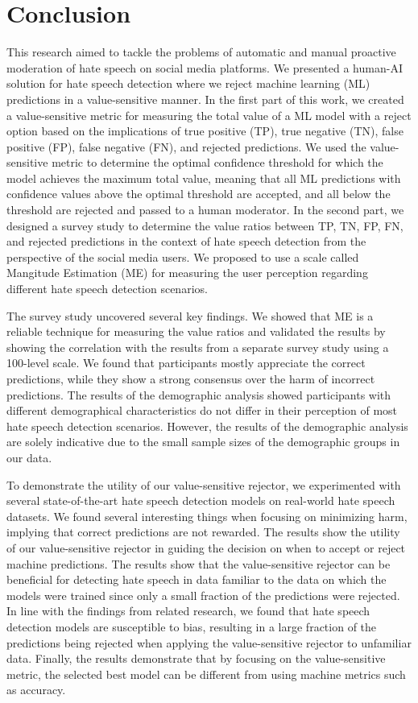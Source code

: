 \chapter{Conclusion}
This research aimed to tackle the problems of automatic and manual proactive moderation of hate speech on social media platforms.
%
We presented a human-AI solution for hate speech detection where we reject machine learning (ML) predictions in a value-sensitive manner.
%
In the first part of this work, we created a value-sensitive metric for measuring the total value of a ML model with a reject option based on the implications of true positive (TP), true negative (TN), false positive (FP), false negative (FN), and rejected predictions.
%
We used the value-sensitive metric to determine the optimal confidence threshold for which the model achieves the maximum total value, meaning that all ML predictions with confidence values above the optimal threshold are accepted, and all below the threshold are rejected and passed to a human moderator.
%
In the second part, we designed a survey study to determine the value ratios between TP, TN, FP, FN, and rejected predictions in the context of hate speech detection from the perspective of the social media users.
%
We proposed to use a scale called Mangitude Estimation (ME) for measuring the user perception regarding different hate speech detection scenarios.
%

%
The survey study uncovered several key findings.
%
We showed that ME is a reliable technique for measuring the value ratios and validated the results by showing the correlation with the results from a separate survey study using a 100-level scale.
%
We found that participants mostly appreciate the correct predictions, while they show a strong consensus over the harm of incorrect predictions.
%
The results of the demographic analysis showed participants with different demographical characteristics do not differ in their perception of most hate speech detection scenarios.
%
However, the results of the demographic analysis are solely indicative due to the small sample sizes of the demographic groups in our data.
%

%
To demonstrate the utility of our value-sensitive rejector, we experimented with several state-of-the-art hate speech detection models on real-world hate speech datasets.
%
We found several interesting things when focusing on minimizing harm, implying that correct predictions are not rewarded.
%
The results show the utility of our value-sensitive rejector in guiding the decision on when to accept or reject machine predictions.
%
The results show that the value-sensitive rejector can be beneficial for detecting hate speech in data familiar to the data on which the models were trained since only a small fraction of the predictions were rejected.
%
In line with the findings from related research, we found that hate speech detection models are susceptible to bias, resulting in a large fraction of the predictions being rejected when applying the value-sensitive rejector to unfamiliar data.
%
Finally, the results demonstrate that by focusing on the value-sensitive metric, the selected best model can be different from using machine metrics such as accuracy.
%

%
